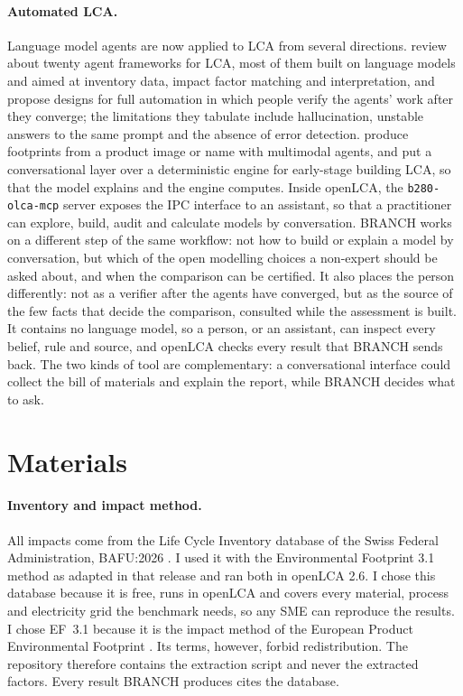 \documentclass{article}
\begin{document}
\paragraph{Automated LCA.}
Language model agents are now applied to LCA from several directions. \citet{preuss2026} review about
twenty agent frameworks for LCA, most of them built on language models and aimed at inventory data, impact
factor matching and interpretation, and propose designs for full automation in which people verify the
agents' work after they converge; the limitations they tabulate include hallucination, unstable answers
to the same prompt and the absence of error detection. \citet{zhang2026} produce footprints from a product
image or name with multimodal agents, and \citet{nouri2026} put a conversational layer over a
deterministic engine for early-stage building LCA, so that the model explains and the engine computes. Inside openLCA, the
\texttt{b280-olca-mcp} server \citep{below280_2026} exposes the IPC interface to an assistant, so that a
practitioner can explore, build, audit and calculate models by conversation.
BRANCH works on a different step of the same workflow: not how to build or explain a model by
conversation, but which of the open modelling choices a non-expert should be asked about, and when the
comparison can be certified. It also places the person differently: not as a verifier after the agents
have converged, but as the source of the few facts that decide the comparison, consulted while the
assessment is built. It contains no language model, so a person, or an assistant, can inspect
every belief, rule and source, and openLCA checks every result that BRANCH sends back. The two kinds of
tool are complementary: a conversational interface could collect the bill of materials and explain the
report, while BRANCH decides what to ask.

\section{Materials}\label{sec:materials}

\paragraph{Inventory and impact method.}
All impacts come from the Life Cycle Inventory database of the Swiss Federal Administration, BAFU:2026
\citep{bafu2026}. I used it with the Environmental Footprint 3.1 method as adapted in that release and ran
both in openLCA 2.6. I chose this database because it is free, runs in openLCA and covers every
material, process and electricity grid the benchmark needs, so any SME can reproduce the results. I chose
EF~3.1 because it is the impact method of the European Product Environmental Footprint
\citep{zampori2019}. Its terms, however, forbid redistribution. The repository therefore
contains the extraction script and never the extracted factors. Every result BRANCH produces cites the
database.
\end{document}
